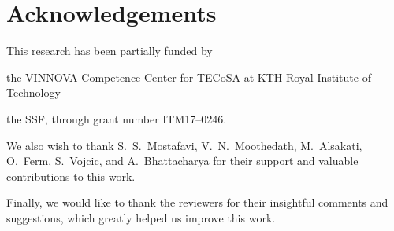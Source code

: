 \section*{Acknowledgements}\label{sec:acks}

This research has been partially funded by
\begin{enumerate*}[itemjoin={{; }}, itemjoin*={{; and }}]
    \item the VINNOVA Competence Center for \ac{TECoSA} at KTH Royal Institute of Technology
    \item the \ac{SSF}, through grant number ITM17--0246.
\end{enumerate*}

We also wish to thank S.~S.~Mostafavi, V.~N.~Moothedath, M.~Alsakati, O.~Ferm, S.~Vojcic, and A.~Bhattacharya for their support and valuable contributions to this work.

Finally, we would like to thank the reviewers for their insightful comments and suggestions, which greatly helped us improve this work.
